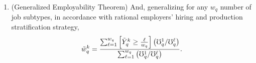 \documentclass[hidelinks, nonatbib]{elsarticle}
\begin{document}
\begin{enumerate}
    \item (Generalized Employability Theorem) And, generalizing for any $w_q$ number of job subtypes, in accordance with rational employers' hiring and production stratification strategy,
    \begin{gather}
        \tilde{w}_{q}^{k} = 
        \frac{
            \sum_{\ell = 1}^{w_q}{
                \left[
                    \tilde{Y}_{q}^{k} 
                    \geq 
                    \frac{\ell}{w_q}
                \right]
                \left(
                    \mho_{q}^{1}
                    /
                    \mho_{q}^{\ell}
                \right)
            }
        }{
            \sum_{\ell = 1}^{w_q}{
                \left(
                    \mho_{q}^{1}
                    /
                    \mho_{q}^{\ell}
                \right)
            }
        }
        .
    \end{gather}


\end{enumerate}
\end{document}
